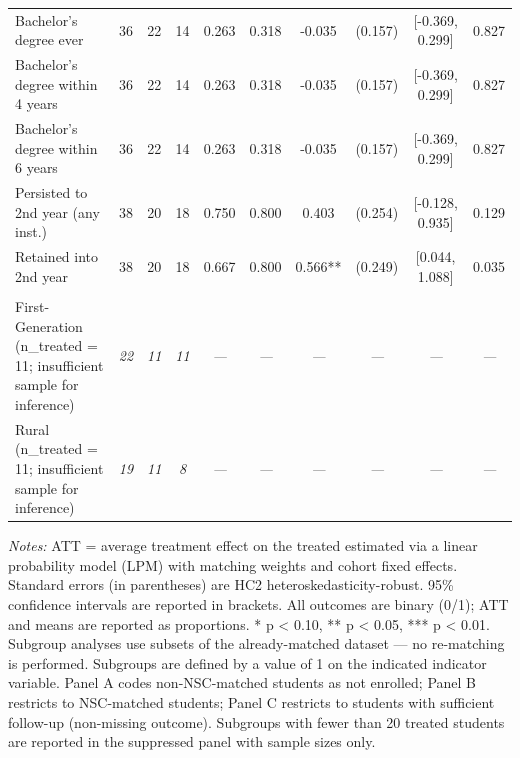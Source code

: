 \begin{table}[t]
\begin{tabular*}{\linewidth}{@{\extracolsep{\fill}}l|ccccccccc}
Bachelor's degree ever & 36 & 22 & 14 & 0.263 & 0.318 & -0.035 & (0.157) & [-0.369, 0.299] & 0.827 \\ 
Bachelor's degree within 4 years & 36 & 22 & 14 & 0.263 & 0.318 & -0.035 & (0.157) & [-0.369, 0.299] & 0.827 \\ 
Bachelor's degree within 6 years & 36 & 22 & 14 & 0.263 & 0.318 & -0.035 & (0.157) & [-0.369, 0.299] & 0.827 \\ 
Persisted to 2nd year (any inst.) & 38 & 20 & 18 & 0.750 & 0.800 & 0.403 & (0.254) & [-0.128, 0.935] & 0.129 \\ 
Retained into 2nd year & 38 & 20 & 18 & 0.667 & 0.800 & 0.566** & (0.249) & [0.044, 1.088] & 0.035 \\ 
\midrule\addlinespace[2.5pt]
\multicolumn{10}{l}{{\itshape \textbf{Suppressed Subgroups} \emph{(n \textless{} 20 treated --- insufficient for inference)}}} \\[2.5pt] 
\midrule\addlinespace[2.5pt]
First-Generation (n\_treated = 11; insufficient sample for inference) & {\itshape \textcolor[HTML]{7F7F7F}{22}} & {\itshape \textcolor[HTML]{7F7F7F}{11}} & {\itshape \textcolor[HTML]{7F7F7F}{11}} & {\itshape \textcolor[HTML]{7F7F7F}{—}} & {\itshape \textcolor[HTML]{7F7F7F}{—}} & {\itshape \textcolor[HTML]{7F7F7F}{—}} & {\itshape \textcolor[HTML]{7F7F7F}{—}} & {\itshape \textcolor[HTML]{7F7F7F}{—}} & {\itshape \textcolor[HTML]{7F7F7F}{—}} \\ 
Rural (n\_treated = 11; insufficient sample for inference) & {\itshape \textcolor[HTML]{7F7F7F}{19}} & {\itshape \textcolor[HTML]{7F7F7F}{11}} & {\itshape \textcolor[HTML]{7F7F7F}{8}} & {\itshape \textcolor[HTML]{7F7F7F}{—}} & {\itshape \textcolor[HTML]{7F7F7F}{—}} & {\itshape \textcolor[HTML]{7F7F7F}{—}} & {\itshape \textcolor[HTML]{7F7F7F}{—}} & {\itshape \textcolor[HTML]{7F7F7F}{—}} & {\itshape \textcolor[HTML]{7F7F7F}{—}} \\ 
\bottomrule
\end{tabular*}
\begin{minipage}{\linewidth}
\vspace{.05em}
\emph{Notes:} ATT = average treatment effect on the treated estimated via a linear probability model (LPM) with matching weights and cohort fixed effects. Standard errors (in parentheses) are HC2 heteroskedasticity-robust. 95\% confidence intervals are reported in brackets. All outcomes are binary (0/1); ATT and means are reported as proportions. * p \textless{} 0.10, ** p \textless{} 0.05, *** p \textless{} 0.01.\\
Subgroup analyses use subsets of the already-matched dataset --- no re-matching is performed. Subgroups are defined by a value of 1 on the indicated indicator variable. Panel A codes non-NSC-matched students as not enrolled; Panel B restricts to NSC-matched students; Panel C restricts to students with sufficient follow-up (non-missing outcome). Subgroups with fewer than 20 treated students are reported in the suppressed panel with sample sizes only.\\

\end{minipage}
\end{table}
